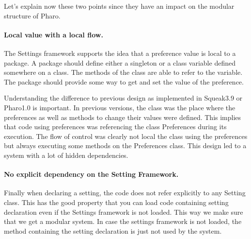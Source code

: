 \documentclass[a4paper,10pt,twoside]{book}
\begin{document}
Let's explain now these two points since they have an impact on the modular structure of Pharo. 


\paragraph{Local value with a local flow.}
The Settings framework supports the idea that a preference value is local to a package. A package should define either a singleton or a class variable defined somewhere on a class. The methods of the class are able to refer to the variable. The package should provide some way to get and set the value of the preference.

Understanding the difference to previous design as implemented in Squeak3.9 or Pharo1.0 is important. In previous versions, the class  was the place where the preferences as well as methods to change their values were defined. This implies that code using preferences was  referencing the class Preferences during its execution. The flow of control was clearly not local the class using the preferences but always executing some methods on the Preferences class. This design led to a system with a lot of hidden dependencies. 

\paragraph{No explicit dependency on the Setting Framework.}
Finally when declaring a setting, the code does not refer explicitly to any Setting class. This has the good property that you can load code containing setting declaration even if the Settings framework is not loaded. This way we make sure 
that we get a modular system. In case the settings framework is not loaded, the method containing the setting declaration is just not used by the system.



\ifx\wholebook\relax\else
   
   
\end{document}
